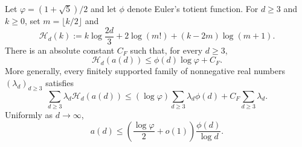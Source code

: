 \begin{theorem}
\label{thm:fibotomic-rank-entropy}
Let $\varphi=(1+\sqrt5)/2$ and let $\phi$ denote Euler's totient function.
For $d\geq3$ and $k\geq0$, set $m=\lfloor k/2\rfloor$ and
\[
 \mathcal H_d(k):=
 k\log\frac{2d}{3}+2\log(m!)+(k-2m)\log(m+1).
\]
There is an absolute constant $C_F$ such that, for every $d\geq3$,
\begin{equation}
\label{eq:fibotomic-rank-entropy}
 \mathcal H_d(a(d))\leq\phi(d)\log\varphi+C_F.
\end{equation}
More generally, every finitely supported family of nonnegative real numbers
$(\lambda_d)_{d\geq3}$ satisfies
\begin{equation}
\label{eq:weighted-fibotomic-rank-entropy}
 \sum_{d\geq3}\lambda_d\mathcal H_d(a(d))
 \leq(\log\varphi)\sum_{d\geq3}\lambda_d\phi(d)
 +C_F\sum_{d\geq3}\lambda_d.
\end{equation}
Uniformly as $d\to\infty$,
\begin{equation}
\label{eq:pointwise-exact-rank-bound}
 a(d)\leq
 \left(\frac{\log\varphi}{2}+o(1)\right)
 \frac{\phi(d)}{\log d}.
\end{equation}
\end{theorem}

